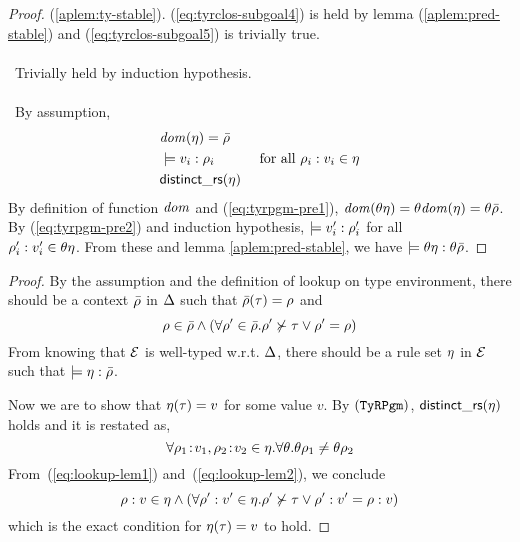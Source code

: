 \begin{proof}
  (\ref{aplem:ty-stable}). (\ref{eq:tyrclos-subgoal4}) is held by lemma
  (\ref{aplem:pred-stable}) and (\ref{eq:tyrclos-subgoal5}) is trivially true.
  \\
  \\
  \case \TyREnv~Trivially held by induction hypothesis.
  \\
  \\
  \case \TyRPgm~By assumption,
  \begin{align}
    \label{eq:tyrpgm-pre1}
    & {\it dom }(\eta) = \bar{\rho} \\
    \label{eq:tyrpgm-pre2}
    & \models v_i:\rho_i & \text{~for all~}
    \rho_i:v_i \in \eta \\
    \label{eq:tyrpgm-pre3}
    & {\sf distinct\_rs}(\eta)
  \end{align}
  By definition of function ${\it dom }$ and (\ref{eq:tyrpgm-pre1}),
  ${\it dom }(\theta \eta) = \theta {\it dom }(\eta) = \theta
  \bar{\rho}$. By (\ref{eq:tyrpgm-pre2}) and induction hypothesis,
  $\models v_i':\rho_i'$ for all \\
  $\rho_i':v_i' \in \theta \eta$. From these and
  lemma \ref{aplem:pred-stable}, we have $\models \theta
    \eta:\theta \bar{\rho}$.
\end{proof}


\begin{proof}
  By the assumption and the definition of lookup on type environment,
  there should be a context $\bar{\rho}$ in $\Delta$ such that
  $\bar{\rho}(\tau) = \rho$  and
  \begin{equation}
    \label{eq:lookup-lem1}
    \rho \in \bar{\rho} \land
    (\forall \rho' \in \bar{\rho}. \rho' \nsucc \tau 
    \lor \rho' = \rho)
  \end{equation}
  From knowing that $\mathcal{E}$ is well-typed w.r.t. $\Delta$, there should be a rule
  set $\eta$ in $\mathcal{E}$ such that $\models
  \eta:\bar{\rho}$.
  
  Now we are to show that $\eta(\tau) = v$ for some value
  $v$. By $\mbox{({\tt TyRPgm})}$, ${\sf distinct\_rs}(\eta)$ holds and it is restated
  as,
  \begin{equation}
    \label{eq:lookup-lem2}
    \forall \rho_1\!:\!v_1, \rho_2\!:\!v_2 \in
    \eta. \forall \theta. \theta \rho_1 \neq \theta \rho_2 
  \end{equation}
  From~(\ref{eq:lookup-lem1}) and~(\ref{eq:lookup-lem2}), we conclude
  \begin{equation*}
    \rho:v \in \eta \land
    (\forall \rho':v' \in \eta. 
    \rho' \nsucc \tau \lor 
    \rho':v' = \rho:v)
  \end{equation*}  
  which is the exact condition for $\eta(\tau) = v$ to hold.
\end{proof}

